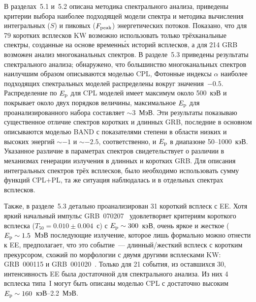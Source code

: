 В разделах~5.1 и~5.2 описана методика спектрального анализа, приведены критерии 
выбора наиболее подходящей модели спектра
и методика вычисления интегральных ($S$) и пиковых ($F_{\mathrm{peak}}$) энергетических потоков. 
Показано, что для 79 коротких всплесков KW возможно использовать только трёхканальные спектры, 
созданные на основе временн\'{ы}х историй всплесков, а для 214 GRB возможен анализ многоканальных спектров.
В разделе~5.3 приведены результаты спектрального анализа; обнаружено, 
что большинство многоканальных спектров наилучшим образом описываются моделью CPL, 
Фотонные индексы $\alpha$ наиболее подходящих спектральных моделей распределены 
вокруг значения~$-0.5$. Распределение по $E_{\mathrm{p}}$ для CPL моделей имеет максимум около 500~кэВ 
и покрывает около двух порядков величины, максимальное $E_{\mathrm{p}}$ для 
проанализированного набора составляет $\sim 3$~МэВ. 
Эти результаты показываю существенное отличие спектров коротких и длинных GRB, 
последние в основном описываются моделью BAND с показателями степени в области низких 
и высоких энергий $\sim -1$ и $\sim -2.5$, соответственно, и $E_{\mathrm{p}}$ в диапазоне 50--1000~кэВ.
Указанное различие в параметрах спектров свидетельствует о различии в механизмах 
генерации излучения в длинных и коротких GRB.
Для описания интегральных спектров трёх всплесков, было необходимо использовать сумму функций 
CPL+PL, та же ситуация наблюдалась и в отдельных спектрах всплесков. 

Также, в разделе~5.3 детально проанализирован 31 короткий всплеск с EE.
Хотя яркий начальный импульс GRB~070207~\citep{Golenetskii_2007GCN6089}
удовлетворяет критериям короткого всплеска ($T_{50}=0.010\pm0.004$~с) с $E_{\mathrm{p}}\sim 300$~кэВ,
очень яркое и жесткое ($E_{\mathrm{p}}\sim 1.5$~МэВ последующие излучение, которое лишь формально можно
отнести к EE, предполагает, что это событие~--- длинный/жесткий всплеск с коротким прекурсором,
схожий по морфологии с двумя другими всплесками KW: GRB~000115 
и GRB~001020~\citep{Hurley_2000GCN859}. 
Только для 21 события, из оставшихся 30, интенсивность EE была достаточной 
для спектрального анализа. Из них 4 всплеска типа~I могут быть описаны моделью CPL с 
достаточно высоким $E_{\mathrm{p}} \sim 160$~кэВ--2.2~МэВ.

